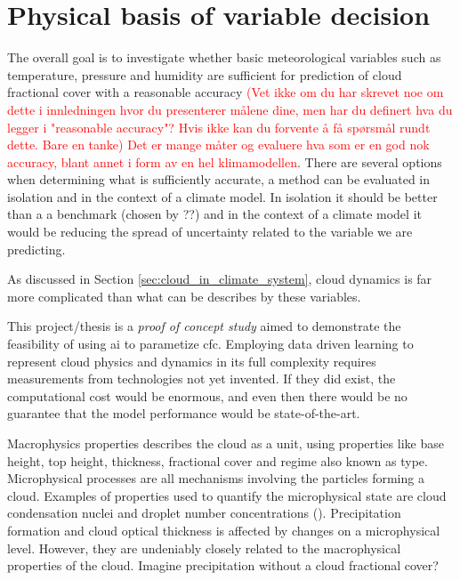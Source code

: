\section{Physical basis of variable decision} \label{sec:ecc}
The overall goal is to investigate whether basic meteorological variables such as temperature, pressure and humidity are sufficient for prediction of cloud fractional cover with a reasonable accuracy \textcolor{red}{(Vet ikke om du har skrevet noe om dette i innledningen hvor du presenterer målene dine, men har du definert hva du legger i "reasonable accuracy"? Hvis ikke kan du forvente å få spørsmål rundt dette. Bare en tanke) Det er mange måter og evaluere hva som er en god nok accuracy, blant annet i form av en hel klimamodellen}.
There are several options when determining what is sufficiently accurate, a method can be evaluated in isolation and in the context of a climate model. In isolation it should be better than a a benchmark (chosen by ??) and in the context of a climate model it would be reducing the spread of uncertainty related to the variable we are predicting. 

As discussed in Section \ref{sec:cloud_in_climate_system}, cloud dynamics is far more complicated than what can be describes by these variables. 

This project/thesis is a \textit{proof of concept study} aimed to demonstrate the feasibility of using \acrshort{ai} to parametize \acrshort{cfc}. Employing data driven learning to represent cloud physics and dynamics in its full complexity requires measurements from technologies not yet invented. If they did exist, the computational cost would be enormous, and even then there would be no guarantee that the model performance would be %
state-of-the-art.

Macrophysics properties describes the cloud as a unit, using properties like base height, top height, thickness, fractional cover and regime also known as type. Microphysical processes are all mechanisms involving the particles forming a cloud. Examples of properties used to quantify the microphysical state
are cloud condensation nuclei and droplet number concentrations (\cite{Grabowski2019ModelingBetter}). Precipitation formation and cloud optical thickness is affected by changes on a microphysical level. However, they are undeniably closely related to the macrophysical properties of the cloud. Imagine precipitation without a cloud fractional cover? 

